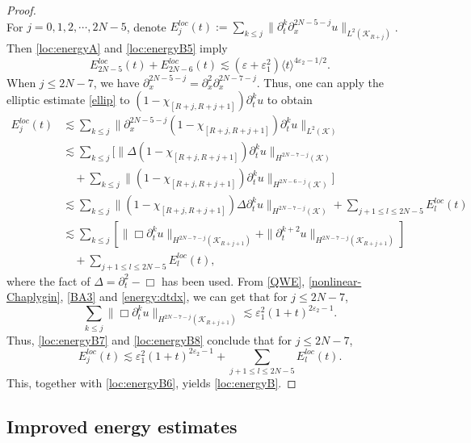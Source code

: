 \documentclass[11pt,twoside]{article}
\def\cK{\mathcal K}
\def\ds{\displaystyle}
\def\p{\partial}
\def\ve{\varepsilon}
\def\ls{\lesssim}
\newcommand{\w}[1]{\langle {#1} \rangle}
\theoremstyle{plain}
\theoremstyle{definition}
\numberwithin{equation}{section}
\begin{document}
\begin{proof}
\begin{equation}
\end{equation}
For $j=0,1,2,\cdots,2N-5$, denote $\ds E_j^{loc}(t):=\sum_{k\le j}\|\p_t^k\p_x^{2N-5-j}u\|_{L^2(\cK_{R+j})}$.
Then \eqref{loc:energyA} and \eqref{loc:energyB5} imply
\begin{equation}\label{loc:energyB6}
E_{2N-5}^{loc}(t)+E_{2N-6}^{loc}(t)\ls(\ve+\ve_1^2)\w{t}^{4\ve_2-1/2}.
\end{equation}
When $j\le2N-7$, we have $\p_x^{2N-5-j}=\p_x^2\p_x^{2N-7-j}$.
Thus, one can apply the elliptic estimate \eqref{ellip} to $(1-\chi_{[R+j,R+j+1]})\p_t^{k}u$
to obtain
\begin{equation}\label{loc:energyB7}
\begin{split}
E_j^{loc}(t)&\ls\sum_{k\le j}\|\p_x^{2N-5-j}(1-\chi_{[R+j,R+j+1]})\p_t^ku\|_{L^2(\cK)}\\
&\ls\sum_{k\le j}[\|\Delta(1-\chi_{[R+j,R+j+1]})\p_t^ku\|_{H^{2N-7-j}(\cK)}\\
&\quad+\sum_{k\le j}\|(1-\chi_{[R+j,R+j+1]})\p_t^ku\|_{H^{2N-6-j}(\cK)}]\\
&\ls\sum_{k\le j}\|(1-\chi_{[R+j,R+j+1]})\Delta\p_t^ku\|_{H^{2N-7-j}(\cK)}+\sum_{j+1\le l\le2N-5}E_l^{loc}(t)\\
&\ls\sum_{k\le j}[\|\Box\p_t^ku\|_{H^{2N-7-j}(\cK_{R+j+1})}+\|\p_t^{k+2}u\|_{H^{2N-7-j}(\cK_{R+j+1})}]\\
&\quad+\sum_{j+1\le l\le2N-5}E_l^{loc}(t),
\end{split}
\end{equation}
where the fact of $\Delta=\p_t^2-\Box$ has been used.
From \eqref{QWE}, \eqref{nonlinear-Chaplygin}, \eqref{BA3} and \eqref{energy:dtdx}, we can get that for $j\le2N-7$,
\begin{equation}\label{loc:energyB8}
\sum_{k\le j}\|\Box\p_t^ku\|_{H^{2N-7-j}(\cK_{R+j+1})}\ls\ve_1^2(1+t)^{2\ve_2-1}.
\end{equation}
Thus, \eqref{loc:energyB7} and \eqref{loc:energyB8} conclude that for $j\le2N-7$,
\begin{equation*}
E_j^{loc}(t)\ls\ve_1^2(1+t)^{2\ve_2-1}+\sum_{j+1\le l\le2N-5}E_l^{loc}(t).
\end{equation*}
This, together with \eqref{loc:energyB6}, yields \eqref{loc:energyB}.
\end{proof}


\subsection{Improved energy estimates}
\end{document}
